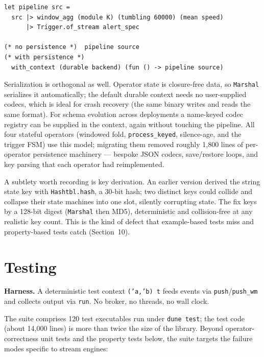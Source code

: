 \documentclass[11pt,a4paper]{article}
\begin{document}
\begin{lstlisting}
let pipeline src =
  src |> window_agg (module K) (tumbling 60000) (mean speed)
      |> Trigger.of_stream alert_spec

(* no persistence *)  pipeline source
(* with persistence *)
  with_context (durable backend) (fun () -> pipeline source)
\end{lstlisting}

Serialization is orthogonal as well. Operator state is closure-free
data, so \texttt{Marshal} serializes it automatically; the default
durable context needs no user-supplied codecs, which is ideal for
crash recovery (the same binary writes and reads the same format).
For schema evolution across deployments a name-keyed codec registry
can be supplied in the context, again without touching the pipeline.
All four stateful operators (windowed fold, \texttt{process\_keyed},
silence-age, and the trigger FSM) use this model; migrating them
removed roughly 1{,}800 lines of per-operator persistence machinery
--- bespoke JSON codecs, save/restore loops, and key parsing that each
operator had reimplemented.

A subtlety worth recording is key derivation. An earlier version
derived the string state key with \texttt{Hashtbl.hash}, a 30-bit
hash; two distinct keys could collide and collapse their state
machines into one slot, silently corrupting state. The fix keys by a
128-bit digest (\texttt{Marshal} then MD5), deterministic and
collision-free at any realistic key count. This is the kind of defect
that example-based tests miss and property-based tests catch
(Section~10).

\section{Testing}

\textbf{Harness.} A deterministic test context \texttt{('a,'b) t}
feeds events via \texttt{push}/\texttt{push\_wm} and collects
output via \texttt{run}. No broker, no threads, no wall clock.

The suite comprises 120 test executables run under
\texttt{dune test}; the test code (about 14{,}000 lines) is more than
twice the size of the library. Beyond operator-correctness unit tests
and the property tests below, the suite targets the failure modes
specific to stream engines:
\end{document}
